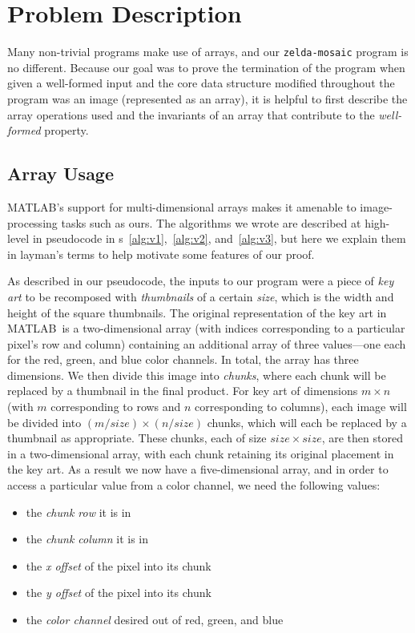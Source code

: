 \documentclass[11pt,conference]{IEEEtran}
\newcommand{\matlab}{MATLAB}
\newcommand{\var}[1]{\mathit{#1}}
\theoremstyle{plain} %
\theoremstyle{definition}
\theoremstyle{remark}
\begin{document}
\section{Problem Description}

Many non-trivial programs make use of arrays, and our \texttt{zelda-mosaic}
program is no different. Because our goal was to prove the termination of the
program when given a well-formed input and the core data structure modified
throughout the program was an image (represented as an array), it is helpful to
first describe the array operations used and the invariants of an array that
contribute to the \emph{well-formed} property.

\subsection{Array Usage}

\matlab's support for multi-dimensional arrays makes it amenable to
image-processing tasks such as ours. The algorithms we wrote are described at
high-level in pseudocode in \figurename{s}~\ref{alg:v1},~\ref{alg:v2},
and~\ref{alg:v3}, but here we explain them in layman's terms to help motivate
some features of our proof.

As described in our pseudocode, the inputs to our program were a piece of
\emph{key art} to be recomposed with \emph{thumbnails} of a certain \emph{size},
which is the width and height of the square thumbnails. The original
representation of the key art in \matlab\ is a two-dimensional array (with
indices corresponding to a particular pixel's row and column) containing an
additional array of three values---one each for the red, green, and blue color
channels. In total, the array has three dimensions. We then divide this image
into \emph{chunks}, where each chunk will be replaced by a
thumbnail in the final product. For key art of dimensions $m
\times n$ (with $m$ corresponding to rows and $n$ corresponding to columns), each
image will be divided into $(m / \var{size}) \times (n / \var{size})$ chunks, which
will each be replaced by a thumbnail as appropriate. These chunks,
each of size $\var{size} \times \var{size}$, are then stored in a two-dimensional array,
with each chunk retaining its original placement in the key art.
As a result we now have a five-dimensional array, and in order to access a
particular value from a color channel, we need the following values:

\begin{itemize}
\item the \emph{chunk row} it is in
\item the \emph{chunk column} it is in
\item the \emph{x offset} of the pixel into its chunk
\item the \emph{y offset} of the pixel into its chunk
\item the \emph{color channel} desired out of red, green, and blue
\end{itemize}
\end{document}
